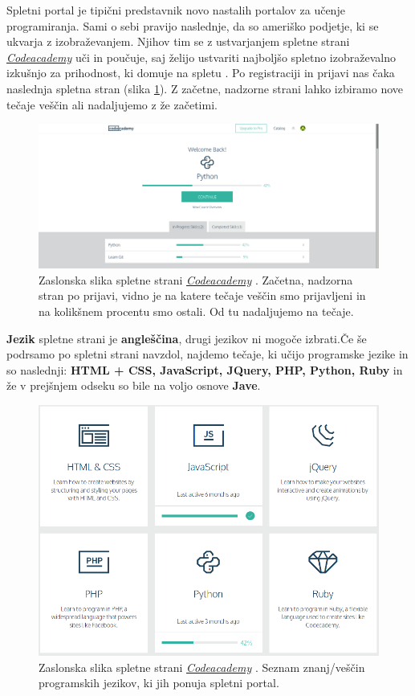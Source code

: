 Spletni portal je tipični predstavnik novo nastalih portalov za učenje
programiranja. Sami o sebi pravijo naslednje, da so ameriško podjetje, ki
se ukvarja z izobraževanjem. Njihov tim se z ustvarjanjem spletne
strani \emph{\href{https://www.codecademy.com/}{Codeacademy}} uči in
poučuje, saj želijo ustvariti najboljšo spletno izobraževalno izkušnjo
za prihodnost, ki domuje na spletu \cite{web:codeacademy}. Po
registraciji in prijavi nas čaka naslednja spletna stran (slika
\ref{fig:scr:web:codeacademy}). Z začetne, nadzorne strani lahko
izbiramo nove tečaje veščin ali nadaljujemo z že začetimi.

\begin{figure}[h!]
    \includegraphics [width=1\linewidth, keepaspectratio =
    1] {./images/sc_web/codeacademy_login_01.png}
    \caption{Zaslonska slika spletne strani
      \emph{\href{https://www.codecademy.com/}{Codeacademy}}
      \cite{web:codeacademy}. Začetna, nadzorna stran po prijavi,
      vidno je na katere tečaje veščin smo prijavljeni in na kolikšnem
    procentu smo ostali. Od tu nadaljujemo na tečaje.}
    \label{fig:scr:web:codeacademy}
\end{figure}

\textbf{Jezik} spletne strani je \textbf{angleščina}, drugi jezikov ni
mogoče izbrati.Če še podrsamo po spletni strani navzdol, najdemo
tečaje, ki učijo programske jezike in so naslednji: \textbf{HTML +
  CSS, JavaScript, JQuery, PHP, Python, Ruby} in že v prejšnjem odseku
so bile na voljo osnove \textbf{Jave}.

\begin{figure}[h!]
  \centering
    \includegraphics [width=0.65\linewidth, keepaspectratio =
    1] {./images/sc_web/codeacademy_vescine_02.png}
    \caption{Zaslonska slika spletne strani
      \emph{\href{https://www.codecademy.com/}{Codeacademy}}
      \cite{web:codeacademy}. Seznam znanj/veščin programskih jezikov,
      ki jih ponuja spletni portal.}
    \label{fig:scr:web:codeacademy:vescine-prog}
\end{figure}

